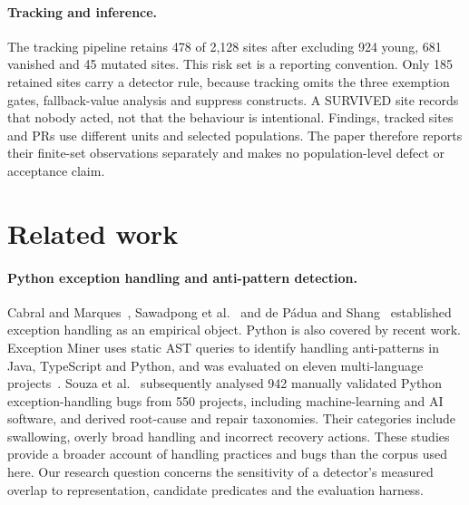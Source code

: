 \documentclass[10pt,a4paper]{article}
\let\cite\citep
\begin{document}
\paragraph{Tracking and inference.}
The tracking pipeline retains 478 of 2,128 sites after excluding 924 young,
681 vanished and 45 mutated sites. This risk set is a reporting convention.
Only 185 retained sites carry a detector rule, because tracking omits the
three exemption gates, fallback-value analysis and suppress constructs.
A SURVIVED site records that nobody acted, not that the behaviour is
intentional. Findings, tracked sites and PRs use different units and
selected populations. The paper therefore reports their finite-set
observations separately and makes no population-level defect or acceptance
claim.

\section{Related work}
\label{sec:related}

\paragraph{Python exception handling and anti-pattern detection.}
Cabral and Marques~\cite{cabral2007}, Sawadpong et al.~\cite{sawadpong2012}
and de P\'adua and Shang~\cite{depadua2017prevalence,depadua2017flow}
established exception handling as an empirical object.
Python is also covered by recent work. Exception Miner uses static AST
queries to identify handling anti-patterns in Java, TypeScript and Python,
and was evaluated on eleven multi-language projects~\cite{souza2024miner}.
Souza et al.~\cite{souza2026python} subsequently analysed 942 manually
validated Python exception-handling bugs from 550 projects, including
machine-learning and AI software, and derived root-cause and repair
taxonomies. Their categories include swallowing, overly broad handling
and incorrect recovery actions. These studies provide a broader account
of handling practices and bugs than the corpus used here. Our research
question concerns the sensitivity of a detector's measured overlap to
representation, candidate predicates and the evaluation harness.
\end{document}
